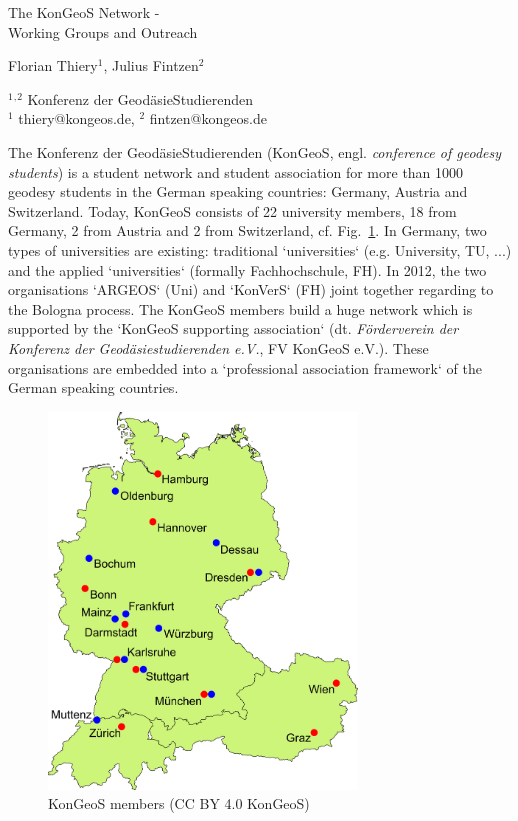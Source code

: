\documentclass[a4paper]{article}
\begin{document}

\Large
 \begin{center}
The KonGeoS Network -\\ Working Groups and Outreach\\ 

\hspace{10pt}

\large
Florian Thiery$^1$, Julius Fintzen$^2$\\

\hspace{10pt}

\small  
$^1$$^,$$^2$ Konferenz der Geod{\"a}sieStudierenden\\
$^1$ thiery@kongeos.de, $^2$ fintzen@kongeos.de\\

\end{center}

\normalsize

The Konferenz der Geod{\"a}sieStudierenden (KonGeoS, engl. \textit{conference of geodesy students}) is a student network and student association for more than 1000 geodesy students in the German speaking countries: Germany, Austria and Switzerland. Today, KonGeoS consists of 22 university members, 18 from Germany, 2 from Austria and 2 from Switzerland, cf. Fig.~\ref{Abb1}. In Germany, two types of universities are existing: traditional `universities` (e.g. University, TU, ...) and the applied `universities` (formally Fachhochschule, FH). In 2012, the two organisations `ARGEOS` (Uni) and `KonVerS` (FH) joint together regarding to the Bologna process. The KonGeoS members build a huge network which is supported by the `KonGeoS supporting association` (dt. \textit{F{\"o}rderverein der Konferenz der Geod{\"a}siestudierenden e.V.}, FV KonGeoS e.V.). These organisations are embedded into a `professional association framework` of the German speaking countries.

\begin{figure}[!h]
\begin{center}
\includegraphics[height=10cm]{karte.png}
\caption{KonGeoS members (CC BY 4.0 KonGeoS)}
\label{Abb1}
\end{center}
\end{figure}
\end{document}
